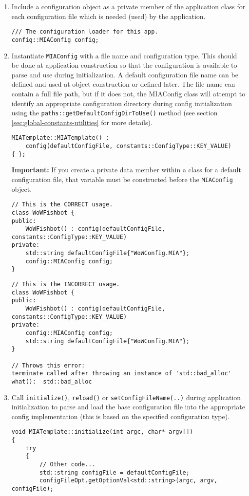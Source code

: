 \begin{enumerate}
	\item Include a configuration object as a private member of the application class for each configuration file which is needed (used) by the application.
	\begin{lstlisting}[style=cppstyle]
/// The configuration loader for this app.
config::MIAConfig config;
	\end{lstlisting}
	\item Instantiate \texttt{MIAConfig} with a file name and configuration type. This should be done at application construction so that the configuration is available to parse and use during initialization. A default configuration file name can be defined and used at object construction or defined later. The file name can contain a full file path, but if it does not, the MIAConfig class will attempt to identify an appropriate configuration directory during config initialization using the \texttt{paths::getDefaultConfigDirToUse()} method (see section \ref{sec:global-constants-utilities} for more details).
	\begin{lstlisting}[style=cppstyle]
MIATemplate::MIATemplate() : 
	config(defaultConfigFile, constants::ConfigType::KEY_VALUE)                      
{ };
	\end{lstlisting}
	\textbf{Important:} If you create a private data member within a class for a default configuration file, that variable must be constructed before the \texttt{MIAConfig} object.
	\begin{lstlisting}[style=cppstyle]
// This is the CORRECT usage.
class WoWFishbot {
public:
	WoWFishbot() : config(defaultConfigFile, constants::ConfigType::KEY_VALUE)
private:
	std::string defaultConfigFile{"WoWConfig.MIA"};
	config::MIAConfig config;
}
	\end{lstlisting}
	\begin{lstlisting}[style=cppstyle]
// This is the INCORRECT usage.
class WoWFishbot {
public:
	WoWFishbot() : config(defaultConfigFile, constants::ConfigType::KEY_VALUE)
private:
	config::MIAConfig config;
	std::string defaultConfigFile{"WoWConfig.MIA"};
}

// Throws this error:
terminate called after throwing an instance of 'std::bad_alloc'
what():  std::bad_alloc
	\end{lstlisting}
	\item Call \texttt{initialize()}, \texttt{reload()} or \texttt{setConfigFileName(..)} during application initialization to parse and load the base configuration file into the appropriate config implementation (this is based on the specified configuration type).
	\begin{lstlisting}[style=cppstyle]
void MIATemplate::initialize(int argc, char* argv[])
{
	try
	{    
		// Other code...
		std::string configFile = defaultConfigFile;
		configFileOpt.getOptionVal<std::string>(argc, argv, configFile);
		

\end{lstlisting}
\end{enumerate}

